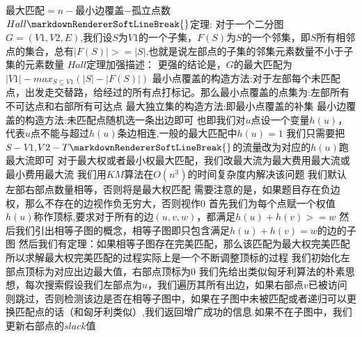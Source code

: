 {}最大匹配$ = $$ n- $最小边覆盖$ - $孤立点数\markdownRendererParagraphSeparator
{}$ Hall\markdownRendererSoftLineBreak
{}$定理:\markdownRendererParagraphSeparator
{}对于一个二分图$ G=(V1,V2,E) $,我们设$ S $为$ V1 $的一个子集，$ F(S) $为$ S $的一个邻集，即$ S $所有相邻点的集合，总有$ |F(S)|>=|S| $,也就是说左部点的子集的邻集元素数量不小于子集的元素数量\markdownRendererParagraphSeparator
{}$ Hall $定理加强描述：\markdownRendererParagraphSeparator
{}更强的结论是，$ G $的最大匹配为$ |V1|-max_{S\subseteq V1}(|S|-|F(S)|) $\markdownRendererParagraphSeparator
{}最小点覆盖的构造方法:对于左部每个未匹配点，出发走交替路，给经过的所有点打标记。那么最小点覆盖的点集为:左部所有不可达点和右部所有可达点\markdownRendererParagraphSeparator
{}最大独立集的构造方法:即最小点覆盖的补集\markdownRendererParagraphSeparator
{}最小边覆盖的构造方法:未匹配点随机选一条出边即可\markdownRendererInterblockSeparator
{}
\markdownRendererSectionEnd \markdownRendererSectionBegin
{}\markdownRendererInterblockSeparator
{}也即我们对$ u $点设一个变量$ h(u) $，代表$ u $点不能与超过$ h(u) $条边相连,一般的最大匹配中$ h(u)=1 $\markdownRendererParagraphSeparator
{}我们只需要把$ S-V1 $,$ V2-T\markdownRendererSoftLineBreak
{}$的流量改为对应的$ h(u) $跑最大流即可\markdownRendererInterblockSeparator
{}
\markdownRendererSectionEnd \markdownRendererSectionBegin
{}\markdownRendererInterblockSeparator
{}对于最大权或者最小权最大匹配，我们改最大流为最大费用最大流或最小费用最大流\markdownRendererInterblockSeparator
{}
\markdownRendererSectionEnd \markdownRendererSectionBegin
{}\markdownRendererInterblockSeparator
{}我们用$ KM $算法在$ O(n^3) $的时间复杂度内解决该问题\markdownRendererParagraphSeparator
{}我们默认左部右部点数量相等，否则将是最大权匹配\markdownRendererParagraphSeparator
{}需要注意的是，如果题目存在负边权，那么不存在的边视作负无穷大，否则视作$ 0 $\markdownRendererParagraphSeparator
{}首先我们为每个点赋一个权值$ h(u) $称作顶标,要求对于所有的边$ (u,v,w) $，都满足$ h(u)+h(v)>=w $\markdownRendererParagraphSeparator
{}然后我们引出相等子图的概念，相等子图即只包含满足$ h(u)+h(v)=w $的边的子图\markdownRendererParagraphSeparator
{}然后我们有定理：如果相等子图存在完美匹配，那么该匹配为最大权完美匹配\markdownRendererParagraphSeparator
{}所以求解最大权完美匹配的过程实际上是一个不断调整顶标的过程\markdownRendererParagraphSeparator
{}我们初始化左部点顶标为对应出边最大值，右部点顶标为0\markdownRendererParagraphSeparator
{}我们先给出类似匈牙利算法的朴素思想，每次搜索假设我们左部点为$ u $，我们遍历其所有出边，如果右部点$ v $已被访问则跳过，否则检测该边是否在相等子图中，如果在子图中未被匹配或者递归可以更换匹配点的话（和匈牙利类似）,我们返回增广成功的信息.如果不在子图中，我们更新右部点的$ slack $值\markdownRendererParagraphSeparator
$$
